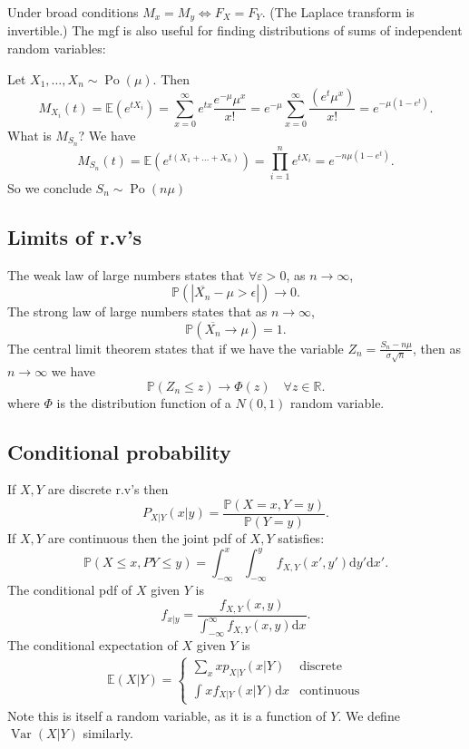 \documentclass[a4paper]{scrartcl}
\begin{document}
Under broad conditions $M_{x}=M_{y} \iff F_{X}=F_{Y}$. (The Laplace transform is invertible.) The mgf is also useful for finding distributions of sums of independent random variables: 
\begin{example*}
     Let $X_1 , \ldots ,X_n \sim \operatorname{Po}(\mu)$. Then \[
     M_{X_{i}}(t)=\mathbb{E}(e^{tX_{i}})=\sum_{x=0}^{ \infty}e^{tx} \frac{e^{-\mu}\mu^{x}}{x!}=e^{-\mu}\sum_{x=0}^{ \infty}\frac{(e^{t}\mu^{x})}{x!}=e^{-\mu (1-e^{t})}
     .\] 
     What is $M_{S_{n}}$? We have \[
     M_{S_{n}}(t)=\mathbb{E}(e^{t (X_1 +\ldots +X_n)})=\prod_{i=1}^n e^{tX_{i}}=e^{-n \mu (1-e^{t})}
     .\] So we conclude $S_{n} \sim \operatorname{Po}(n \mu)$ 
\end{example*}
\subsection{Limits of r.v's}
The weak law of large numbers states that $\forall \varepsilon >0$, as $n \rightarrow \infty$, \[
\mathbb{P} \left(|\overline{X_n} -\mu > \epsilon|\right) \rightarrow 0
.\] 
The strong law of large numbers states that as $n \rightarrow \infty$, \[
\mathbb{P}(\overline{X_{n}} \rightarrow \mu)=1
.\] The central limit theorem states that if we have the variable $Z_{n}= \frac{S_{n}-n \mu}{\sigma \sqrt{n}}$, then as $n \rightarrow \infty$ we have \[
\mathbb{P}(Z_{n} \leq z) \rightarrow \Phi (z) \quad \forall z \in \mathbb{R}
.\] where $\Phi$ is the distribution function of a $N (0,1)$ random variable.  
\subsection{Conditional probability}
If $X,Y$ are discrete r.v's then \[
P_{X|Y}(x|y)= \frac{\mathbb{P}(X=x, Y=y)}{\mathbb{P}(Y=y)}
.\]   
If $X,Y$ are continuous then the joint pdf of $X,Y$ satisfies: \[
\mathbb{P}(X \leq x, P Y \leq y)=\int_{- \infty}^{x}\int_{- \infty}^{y}f_{X,Y} (x',y')\mathrm{d}y'  \mathrm{d}x' 
.\] 
The conditional pdf of $X$ given $Y$ is \[
f_{x|y}= \frac{f_{X,Y}(x,y)}{\int_{- \infty}^{ \infty}f_{X,Y}(x,y) \mathrm{d}x }
.\] 
The conditional expectation of $X$ given $Y$ is 
\begin{align*}
    \mathbb{E}(X|Y)=
    \begin{cases}
        \sum_{x}^{}xp_{X|Y}(x|Y) & \text{discrete}\\
        \int_{}^{}x f_{X|Y}(x|Y) \mathrm{d}x & \text{continuous}
    \end{cases}
\end{align*}
Note this is itself a random variable, as it is a function of $Y$. We define $\operatorname{Var}(X|Y)$ similarly. 
\end{document}
